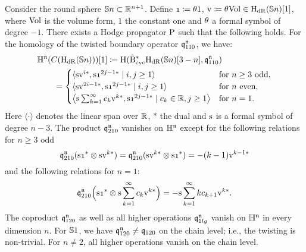 \documentclass[\MainFolder/Text.tex]{subfiles}
\begin{document}
\begin{IntroThm}\label{IntroThm:A}
Consider the round sphere $\mathbb{S}{n}\subset \mathbb{R}^{n+1}$. Define $\NOne\coloneqq \SuspU 1$, $\mathrm{v}\coloneqq \theta \mathrm{Vol} \in \mathrm{H}_{\mathrm{dR}}(\mathbb{S}{n})[1]$, where $\mathrm{Vol}$ is the volume form, $1$ the constant one and $\theta$ a formal symbol of degree $-1$. There exists a Hodge propagator $\mathrm{P}$ such that the following holds. For the homology of the twisted boundary operator $\mathfrak{q}_{110}^{\mathfrak{n}}$, we have:
\begin{equation*}
\begin{aligned}
& \HIBL^\PMC(\CycC(\HDR(\Sph{n})))[1] \coloneqq \H(\CDBCyc \HDR(\Sph{n})[3-n],\OPQ_{110}^\PMC) \\
& \qquad =\begin{cases}
\langle \Susp \NVol^{i*}, \Susp \NOne^{2j-1*} \mid i, j \ge 1\rangle & \text{for }n\ge 3 \text{ odd}, \\
\langle \Susp \NVol^{2 i-1*}, \Susp \NOne^{2j-1*} \mid i, j \ge 1\rangle &\text{for }n\text{ even}, \\
 \bigl\langle \Susp\sum_{k=1}^\infty c_k \NVol^{k*}, \Susp \NOne^{2j-1*}\mid c_k\in \R, j \ge 1\bigr\rangle & \text{for }n=1. 
\end{cases}
\end{aligned}
\end{equation*}
Here $\langle \cdot \rangle$ denotes the linear span over $\mathbb{R}$, $*$ the dual and $\mathrm{s}$ is a formal symbol of degree $n-3$. The product $\mathfrak{q}_{210}^{\mathfrak{n}}$ vanishes on $\mathbb{H}^{\mathfrak{n}}$ except for the following relations for $n\ge 3$ odd
\[ \OPQ_{210}^\PMC(\Susp \NOne^* \otimes \Susp \NVol^{k*}) = \OPQ_{210}^\PMC(\Susp \NVol^{k*} \otimes \Susp \NOne^*) = -(k-1) \NVol^{k-1*} \]
and the following relations for $n=1$:
\[ \OPQ_{210}^\PMC\Bigl(\Susp \NOne^* \otimes \Susp\sum_{k=1}^\infty c_k \NVol^{k*}\Bigr) = - \Susp \sum_{k=1}^\infty k c_{k+1} \NVol^{k*}.  \]
The coproduct $\mathfrak{q}_{120}^{\mathfrak{n}}$ as well as all higher operations $\mathfrak{q}_{1lg}^{\mathfrak{n}}$ vanish on $\mathbb{H}^{\mathfrak{n}}$ in every  dimension $n$. For $\mathbb{S}{1}$, we have $\mathfrak{q}_{120}^{\mathfrak{n}} \neq \mathfrak{q}_{120}$ on the chain level; i.e., the twisting is non-trivial. For $n\neq 2$, all higher operations vanish on the chain level.


\end{IntroThm}
\end{document}
